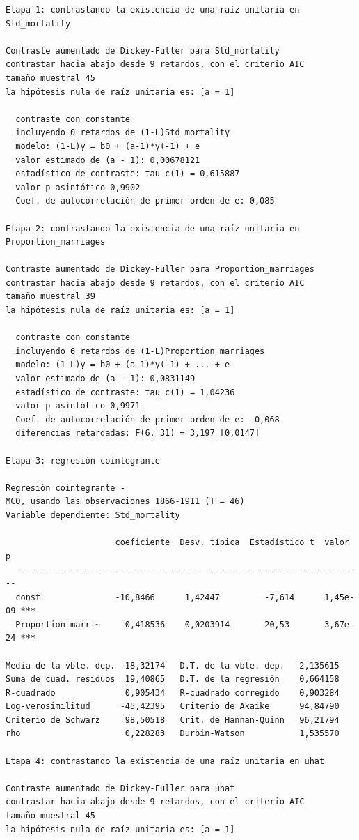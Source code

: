 \documentclass[10pt]{article}
\begin{document}
\begin{verbatim}
Etapa 1: contrastando la existencia de una raíz unitaria en Std_mortality

Contraste aumentado de Dickey-Fuller para Std_mortality
contrastar hacia abajo desde 9 retardos, con el criterio AIC
tamaño muestral 45
la hipótesis nula de raíz unitaria es: [a = 1]

  contraste con constante 
  incluyendo 0 retardos de (1-L)Std_mortality
  modelo: (1-L)y = b0 + (a-1)*y(-1) + e
  valor estimado de (a - 1): 0,00678121
  estadístico de contraste: tau_c(1) = 0,615887
  valor p asintótico 0,9902
  Coef. de autocorrelación de primer orden de e: 0,085

Etapa 2: contrastando la existencia de una raíz unitaria en Proportion_marriages

Contraste aumentado de Dickey-Fuller para Proportion_marriages
contrastar hacia abajo desde 9 retardos, con el criterio AIC
tamaño muestral 39
la hipótesis nula de raíz unitaria es: [a = 1]

  contraste con constante 
  incluyendo 6 retardos de (1-L)Proportion_marriages
  modelo: (1-L)y = b0 + (a-1)*y(-1) + ... + e
  valor estimado de (a - 1): 0,0831149
  estadístico de contraste: tau_c(1) = 1,04236
  valor p asintótico 0,9971
  Coef. de autocorrelación de primer orden de e: -0,068
  diferencias retardadas: F(6, 31) = 3,197 [0,0147]

Etapa 3: regresión cointegrante

Regresión cointegrante - 
MCO, usando las observaciones 1866-1911 (T = 46)
Variable dependiente: Std_mortality

                      coeficiente  Desv. típica  Estadístico t  valor p 
  ----------------------------------------------------------------------
  const               -10,8466      1,42447         -7,614      1,45e-09 ***
  Proportion_marri~     0,418536    0,0203914       20,53       3,67e-24 ***

Media de la vble. dep.  18,32174   D.T. de la vble. dep.   2,135615
Suma de cuad. residuos  19,40865   D.T. de la regresión    0,664158
R-cuadrado              0,905434   R-cuadrado corregido    0,903284
Log-verosimilitud      -45,42395   Criterio de Akaike      94,84790
Criterio de Schwarz     98,50518   Crit. de Hannan-Quinn   96,21794
rho                     0,228283   Durbin-Watson           1,535570

Etapa 4: contrastando la existencia de una raíz unitaria en uhat

Contraste aumentado de Dickey-Fuller para uhat
contrastar hacia abajo desde 9 retardos, con el criterio AIC
tamaño muestral 45
la hipótesis nula de raíz unitaria es: [a = 1]


\end{verbatim}
\end{document}
